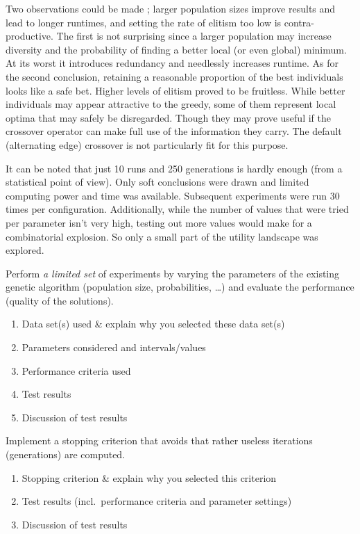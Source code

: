\par\noindent Two observations could be made ; larger population sizes improve results and lead to longer runtimes, and setting the rate of elitism too low is contra-productive. The first is not surprising since a larger population may increase diversity and the probability of finding a better local (or even global) minimum. At its worst it introduces redundancy and needlessly increases runtime. As for the second conclusion, retaining a reasonable proportion of the best individuals looks like a safe bet. Higher levels of elitism proved to be fruitless. While better individuals may appear attractive to the greedy, some of them represent local optima that may safely be disregarded. Though they may prove useful if the crossover operator can make full use of the information they carry. The default (alternating edge) crossover is not particularly fit for this purpose.\\

\par\noindent It can be noted that just 10 runs and 250 generations is hardly enough (from a statistical point of view). Only soft conclusions were drawn and limited computing power and time was available. Subsequent experiments were run 30 times per configuration. Additionally, while the number of values that were tried per parameter isn't very high, testing out more values would make for a combinatorial explosion. So only a small part of the utility landscape was explored.\\

\par\noindent Perform \emph{a limited set} of experiments by varying the parameters of the existing genetic algorithm (population size, probabilities, \ldots) and evaluate the performance (quality of the solutions).
\begin{enumerate}

\item Data set(s) used  \& explain why you selected these data set(s)
\item Parameters considered and intervals/values
\item  Performance criteria used
\item Test results 
\item Discussion of test results

\end{enumerate}

Implement a stopping criterion that avoids that rather useless iterations (generations) are computed.
\begin{enumerate}
\item	 Stopping criterion \& explain why you selected this criterion
\item Test results (incl.\ performance criteria and parameter settings)
\item Discussion of test results

\end{enumerate}

